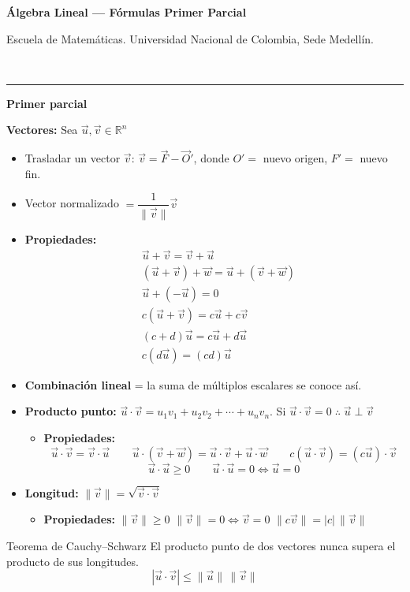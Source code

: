 \documentclass[11pt]{article}
\newcommand{\examheader}{%
  \noindent
  \begin{minipage}[t]{0.6\linewidth}
    {\small\bfseries Álgebra Lineal --- Fórmulas Primer Parcial}\\
  \end{minipage}%
  \hfill
  \begin{minipage}[t]{0.35\linewidth}
    \raggedleft\small Escuela de Matemáticas. Universidad Nacional de Colombia, Sede Medellín.
  \end{minipage}\\[2pt]
  \rule{\linewidth}{0.6pt}
}
\begin{document}
\examheader

\begin{center}
{\bfseries\Large\color{magenta1} Primer parcial}
\end{center}

\vspace{0.2cm}
{\bfseries\color{purple1} Vectores:} Sea $\vec u, \vec v \in \mathbb{R}^n$

\begin{itemize}[leftmargin=1.2em]
\item Trasladar un vector $\vec v$: $\vec v = \vec F - \vec O'$, donde $O'=$ nuevo origen, $F'=$ nuevo fin.
\item Vector normalizado $= \dfrac{1}{\|\vec v\|}\vec v$
\item \textbf{Propiedades:}
\[
\begin{aligned}
&\vec u + \vec v = \vec v + \vec u \\
&(\vec u+\vec v)+\vec w = \vec u+(\vec v+\vec w) \\
&\vec u + (-\vec u) = 0 \\
&c(\vec u+\vec v) = c\vec u + c\vec v \\
&(c+d)\vec u = c\vec u + d\vec u \\
&c(d\vec u) = (cd)\vec u
\end{aligned}
\]
\item \textbf{Combinación lineal} = la suma de múltiplos escalares se conoce así.
\item \textbf{Producto punto:} $\vec u \cdot \vec v = u_1v_1+u_2v_2+\cdots+u_nv_n$. \quad Si $\vec u \cdot \vec v = 0 \;\therefore\; \vec u \perp \vec v$
\begin{itemize}
\item \textbf{Propiedades:}
\[
\vec u \cdot \vec v = \vec v \cdot \vec u \qquad
\vec u \cdot (\vec v+\vec w) = \vec u\cdot \vec v + \vec u \cdot \vec w \qquad
c(\vec u \cdot \vec v) = (c\vec u)\cdot \vec v
\]
\[
\vec u \cdot \vec u \geq 0 \qquad
\vec u \cdot \vec u = 0 \iff \vec u = 0
\]
\end{itemize}
\item \textbf{Longitud:} $\|\vec v\| = \sqrt{\vec v \cdot \vec v}$
\begin{itemize}
\item \textbf{Propiedades:} $\|\vec v\| \geq 0$ \quad $\|\vec v\| = 0 \iff \vec v = 0$ \quad $\|c\vec v\| = |c|\,\|\vec v\|$
\end{itemize}
\end{itemize}

\vspace{0.2cm}
\begin{defbox4}{Teorema de Cauchy--Schwarz}
El producto punto de dos vectores nunca supera el producto de sus longitudes.
\[
|\vec u \cdot \vec v| \leq \|\vec u\|\,\|\vec v\|
\]
\end{defbox4}
\end{document}
